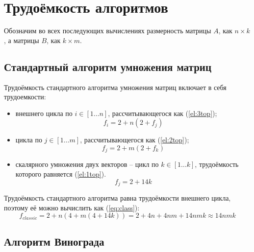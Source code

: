 \section{Трудоёмкость алгоритмов}

Обозначим во всех последующих вычислениях размерность матрицы $A$, как $n \times k$, а матрицы $B$, как $k \times m$.

\subsection{Стандартный алгоритм умножения матриц}

Трудоёмкость стандартного алгоритма умножения матриц включает в себя трудоемкости:
\begin{itemize}
	\item внешнего цикла по $i \in [1 \dots n]$, рассчитывающегося как (\ref{el:3top});
        \begin{equation}
            \label{el:3top}
            f_{i} = 2 + n(2 + f_{j})
        \end{equation}
	\item цикла по $j \in [1 \dots m]$, рассчитывающегося как (\ref{el:2top});
        \begin{equation}
            \label{el:2top}
            f_{j} = 2 + m(2 + f_{k})
        \end{equation}
	\item скалярного умножения двух векторов -- цикл по $k \in [1 \dots k]$, трудоёмкость которого равняется (\ref{el:1top}).
        \begin{equation}
            \label{el:1top}
            f_{j} = 2 + 14k
        \end{equation}
\end{itemize}

Трудоёмкость стандартного алгоритма равна трудоёмкости внешнего цикла, поэтому её можно вычислить как (\ref{eq:class}):
\begin{equation}
	\label{eq:class}
	f_{classic} = 2 + n(4 + m(4 + 14k)) = 2 + 4n + 4nm + 14nmk \approx 14nmk
\end{equation}

\subsection{Алгоритм Винограда}

